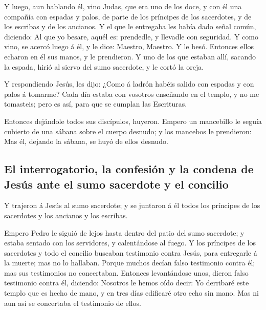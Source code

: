 Y luego, aun hablando él, vino Judas, que era uno de los
doce, y con él una compañía con espadas y palos, de parte de los
príncipes de los sacerdotes, y de los escribas y de los ancianos.
 Y el que le entregaba les había dado señal común,
diciendo: Al que yo besare, aquél es: prendedle, y llevadle con
seguridad.  Y como vino, se acercó luego á él, y le dice:
Maestro, Maestro. Y le besó.  Entonces ellos echaron en
él sus manos, y le prendieron.  Y uno de los que estaban
allí, sacando la espada, hirió al siervo del sumo sacerdote, y le cortó
la oreja.

 Y respondiendo Jesús, les dijo: ¿Como á ladrón habéis
salido con espadas y con palos á tomarme?  Cada día
estaba con vosotros enseñando en el templo, y no me tomasteis; pero es
así, para que se cumplan las Escrituras.

 Entonces dejándole todos sus discípulos, huyeron.
 Empero un mancebillo le seguía cubierto de una sábana
sobre el cuerpo desnudo; y los mancebos le prendieron: 
Mas él, dejando la sábana, se huyó de ellos desnudo.

\hypertarget{el-interrogatorio-la-confesiuxf3n-y-la-condena-de-jesuxfas-ante-el-sumo-sacerdote-y-el-concilio}{%
\subsection{El interrogatorio, la confesión y la condena de Jesús ante
el sumo sacerdote y el
concilio}\label{el-interrogatorio-la-confesiuxf3n-y-la-condena-de-jesuxfas-ante-el-sumo-sacerdote-y-el-concilio}}

 Y trajeron á Jesús al sumo sacerdote; y se juntaron á él
todos los príncipes de los sacerdotes y los ancianos y los escribas.

 Empero Pedro le siguió de lejos hasta dentro del patio
del sumo sacerdote; y estaba sentado con los servidores, y calentándose
al fuego.  Y los príncipes de los sacerdotes y todo el
concilio buscaban testimonio contra Jesús, para entregarle á la muerte;
mas no lo hallaban.  Porque muchos decían falso
testimonio contra él; mas sus testimonios no concertaban.
 Entonces levantándose unos, dieron falso testimonio
contra él, diciendo:  Nosotros le hemos oído decir: Yo
derribaré este templo que es hecho de mano, y en tres días edificaré
otro echo sin mano.  Mas ni aun así se concertaba el
testimonio de ellos.

